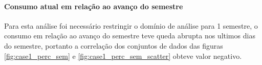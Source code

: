         \paragraph{Consumo atual em relação ao avanço do semestre}
        Para esta análise foi necessário restringir o domínio de análise para 1 semestre, o consumo em relação ao avanço do semestre teve queda abrupta nos ultimos dias do semestre, portanto a correlação dos conjuntos de dados das figuras \ref{fig:case1_perc_sem} e \ref{fig:case1_perc_sem_scatter} obteve valor negativo.
        {
        \begin{center} 
        
            \begin{minipage}[c]{1.0\textwidth}
                \begin{figure}[H]
                \end{figure}  
            \end{minipage} \hfill %
        
            \begin{minipage}[c]{0.5\textwidth}
                \begin{figure}[H]
                \end{figure}
            \end{minipage} 
        \end{center} 
        }

